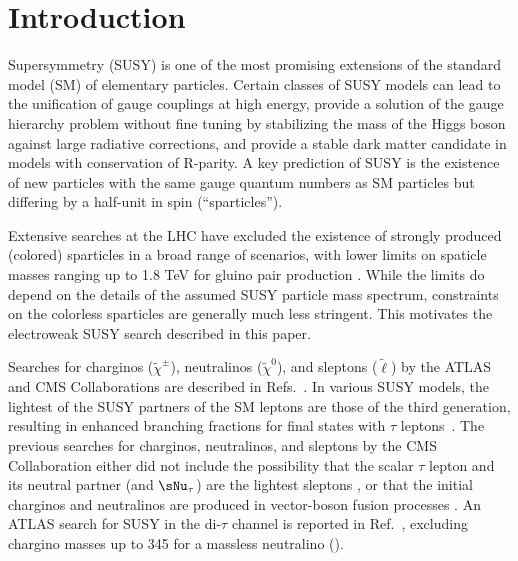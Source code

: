 \section{Introduction}
\label{sect:introduction}

Supersymmetry (SUSY) \cite{Golfand:1971iw,Wess:1973kz,Wess:1974tw,Fayet1,Fayet2} is one of the most promising extensions of the 
standard model (SM) of elementary particles.  
Certain classes of SUSY models can lead to the unification of gauge couplings at high energy, 
provide a solution of the gauge hierarchy problem without fine tuning by stabilizing the mass of the Higgs boson 
against large radiative corrections, and provide a stable dark matter candidate in models with conservation of R-parity.
A key prediction of SUSY is the existence of new particles with the same gauge quantum numbers as SM particles but
differing by a half-unit in spin (``sparticles'').


Extensive searches at the LHC have excluded the existence of strongly produced (colored) sparticles in a broad range of scenarios, 
with lower limits on spaticle masses ranging up to 1.8 TeV for gluino pair production 
\cite{Chatrchyan:2013fea,Chatrchyan:2013mys,Chatrchyan:2014aea,Chatrchyan:2014lfa,Khachatryan:2015vra,Khachatryan:2015lwa,Aad:2015pfx,Aad:2015iea}. 
While the limits do depend on the details of the assumed SUSY particle mass spectrum, 
constraints on the colorless sparticles are generally much less stringent.
This motivates the electroweak SUSY search described in this paper.


Searches for charginos ($\widetilde{\chi}^{\pm}\xspace$), neutralinos ($\widetilde{\chi}^{0}\xspace$), and sleptons ($\widetilde{\ell}\xspace$) by the ATLAS and CMS Collaborations are described in Refs.~\cite{Aad:2014nua,Aad:2014vma,Khachatryan:2014qwa,Khachatryan:2014mma,Khachatryan:2015kxa}.
In various SUSY models, the lightest of the SUSY partners of the SM leptons are those of the third generation, 
resulting in enhanced branching fractions for final states with $\tau$ leptons~\cite{Martin:1997ns}.  
The previous searches for charginos, neutralinos, and sleptons by the CMS Collaboration  either did not include the possibility that 
the scalar $\tau$ lepton and its neutral partner (\stau and $\sNu_\tau$) 
are the lightest sleptons \cite{Khachatryan:2014qwa}, or that the initial charginos and neutralinos are produced in vector-boson fusion processes \cite{Khachatryan:2015kxa}. An ATLAS search for SUSY in the di-$\tau$ channel is reported in Ref.~\cite{Aad:2014yka}, excluding chargino masses up to 345\GeV 
for a massless neutralino (\PSGczDo).

